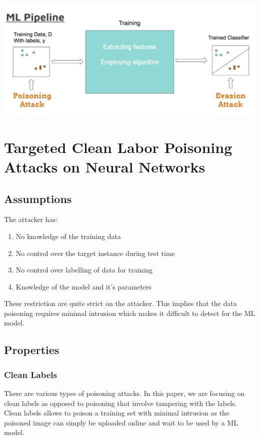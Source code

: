 \documentclass[twoside]{article}
\begin{document}
\begin{center}
\includegraphics[scale=0.3]{MLpipeline.png}
\end{center}

\section{Targeted Clean Labor Poisoning Attacks on Neural Networks}

\subsection{Assumptions}

The attacker has:
\begin{enumerate}
  \item No knowledge of the training data
  \item No control over the target instance during test time
  \item No control over labelling of data for training
  \item Knowledge of the model and it's parameters
\end{enumerate}

These restriction are quite strict on the attacker. This implies that the data poisoning requires minimal intrusion which makes it difficult to detect for the ML model.
\subsection{Properties}

\subsubsection*{Clean Labels}

There are various types of poisoning attacks. In this paper, we are focusing on clean labels as opposed to poisoning that involve tampering with the labels. Clean labels allows to poison a training set with minimal intrusion as the poisoned image can simply be uploaded online and wait to be used by a ML model.
\end{document}
